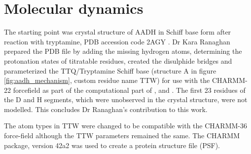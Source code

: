 \section{Molecular dynamics}\label{sec:aadh_md}

The starting point was crystal structure of AADH in Schiff base form after reaction with tryptamine, PDB accession code 2AGY \cite{masgrauAtomicDescriptionEnzyme2006}. Dr Kara Ranaghan prepared the PDB file by adding the missing hydrogen atoms, determining the protonation states of titratable residues, created the disulphide bridges and parameterized the TTQ/Tryptamine Schiff base (structure A in figure \ref{fig:aadh_mechanism}, custom residue name TTW) for use with the CHARMM-22 forcefield \cite{a.d.mackerellAllAtomEmpiricalPotential1998} as part of the computational part of \cite{masgrauAtomicDescriptionEnzyme2006}, \cite{masgrauTunnelingClassicalPaths2007} and \cite{ranaghanInitioQMMM2017}.  The first 23 residues of the D and H segments, which were unobserved in the crystal structure, were not modelled. This concludes Dr Ranaghan's contribution to this work. 

The atom types in TTW were changed to be compatible with the CHARMM-36 \cite{huangCHARMM36AllatomAdditive2013} force-field although the TTW parameters remained the same. The CHARMM package, version 42a2 \cite{brooksCHARMMBiomolecularSimulation2009} was used to create a protein structure file (PSF). 

